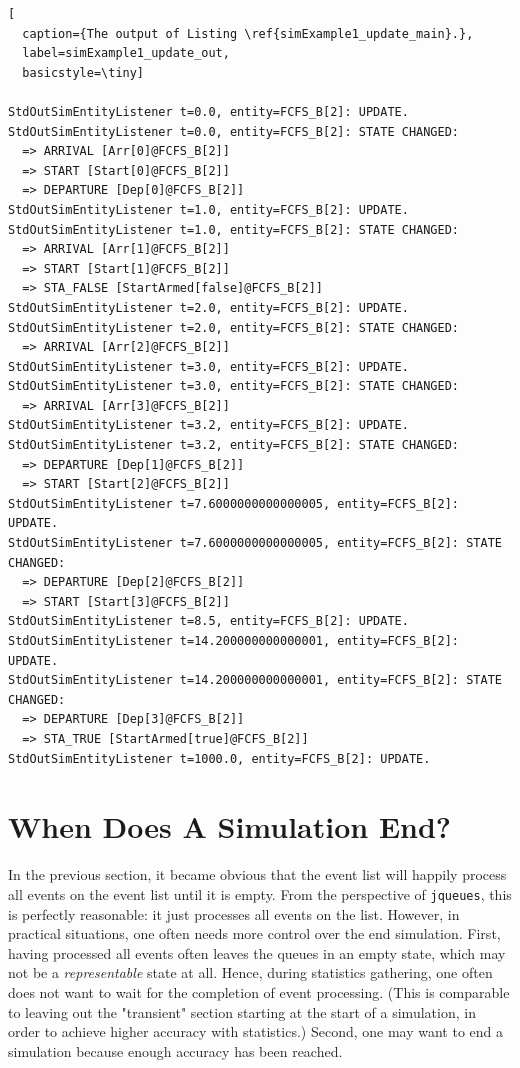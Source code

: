 \documentclass[12pt]{book}
\begin{document}
\begin{lstfloat}
\begin{lstlisting}[
  caption={The output of Listing \ref{simExample1_update_main}.},
  label=simExample1_update_out,
  basicstyle=\tiny]

StdOutSimEntityListener t=0.0, entity=FCFS_B[2]: UPDATE.
StdOutSimEntityListener t=0.0, entity=FCFS_B[2]: STATE CHANGED:
  => ARRIVAL [Arr[0]@FCFS_B[2]]
  => START [Start[0]@FCFS_B[2]]
  => DEPARTURE [Dep[0]@FCFS_B[2]]
StdOutSimEntityListener t=1.0, entity=FCFS_B[2]: UPDATE.
StdOutSimEntityListener t=1.0, entity=FCFS_B[2]: STATE CHANGED:
  => ARRIVAL [Arr[1]@FCFS_B[2]]
  => START [Start[1]@FCFS_B[2]]
  => STA_FALSE [StartArmed[false]@FCFS_B[2]]
StdOutSimEntityListener t=2.0, entity=FCFS_B[2]: UPDATE.
StdOutSimEntityListener t=2.0, entity=FCFS_B[2]: STATE CHANGED:
  => ARRIVAL [Arr[2]@FCFS_B[2]]
StdOutSimEntityListener t=3.0, entity=FCFS_B[2]: UPDATE.
StdOutSimEntityListener t=3.0, entity=FCFS_B[2]: STATE CHANGED:
  => ARRIVAL [Arr[3]@FCFS_B[2]]
StdOutSimEntityListener t=3.2, entity=FCFS_B[2]: UPDATE.
StdOutSimEntityListener t=3.2, entity=FCFS_B[2]: STATE CHANGED:
  => DEPARTURE [Dep[1]@FCFS_B[2]]
  => START [Start[2]@FCFS_B[2]]
StdOutSimEntityListener t=7.6000000000000005, entity=FCFS_B[2]: UPDATE.
StdOutSimEntityListener t=7.6000000000000005, entity=FCFS_B[2]: STATE CHANGED:
  => DEPARTURE [Dep[2]@FCFS_B[2]]
  => START [Start[3]@FCFS_B[2]]
StdOutSimEntityListener t=8.5, entity=FCFS_B[2]: UPDATE.
StdOutSimEntityListener t=14.200000000000001, entity=FCFS_B[2]: UPDATE.
StdOutSimEntityListener t=14.200000000000001, entity=FCFS_B[2]: STATE CHANGED:
  => DEPARTURE [Dep[3]@FCFS_B[2]]
  => STA_TRUE [StartArmed[true]@FCFS_B[2]]
StdOutSimEntityListener t=1000.0, entity=FCFS_B[2]: UPDATE.

\end{lstlisting}
\end{lstfloat}

\section{When Does A Simulation End?}
\label{sec:guided:simulation-end}

In the previous section,
  it became obvious that
  the event list will happily process
  all events on the event list until it is empty.
From the perspective of \lstinline|jqueues|,
  this is perfectly reasonable:
  it just processes all events on the list.
However, in practical situations,
  one often needs more control over the end
  simulation.
First,
  having processed all events often leaves the queues
  in an empty state,
  which may not be a {\em representable\/} state at all.
Hence, during statistics gathering, one often
  does not want to wait for the completion of event
  processing.
(This is comparable to leaving out the "transient"
  section starting at the start of a simulation,
  in order to achieve higher accuracy with statistics.)
Second, one may want to end a simulation because
  enough accuracy has been reached.
\end{document}
